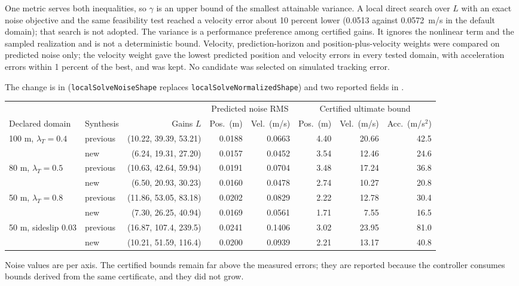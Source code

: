 \documentclass[11pt]{article}
\begin{document}
One metric serves both inequalities, so $\gamma$ is an upper bound of the
smallest attainable variance. A local direct search over $L$ with an exact
noise objective and the same feasibility test reached a velocity error about
10 percent lower (0.0513 against 0.0572~m/s in the default domain); that
search is not adopted. The variance is a performance preference among certified
gains. It ignores the nonlinear term and the sampled realization and is not a
deterministic bound. Velocity, prediction-horizon and position-plus-velocity
weights were compared on predicted noise only; the velocity weight gave the
lowest predicted position and velocity errors in every tested domain, with
acceleration errors within 1 percent of the best, and was kept. No candidate
was selected on simulated tracking error.

The change is in 
(\texttt{localSolveNoiseShape} replaces \texttt{localSolveNormalizedShape})
and two reported fields in .

\begin{center}\footnotesize\setlength{\tabcolsep}{4pt}
\begin{tabular}{@{}llrrrrrr@{}}
\toprule
&&&\multicolumn{2}{c}{Predicted noise RMS}&\multicolumn{3}{c}{Certified ultimate bound}\\
Declared domain&Synthesis&Gains $L$&Pos.\ (m)&Vel.\ (m/s)&Pos.\ (m)&Vel.\ (m/s)&Acc.\ (m/s$^2$)\\
\midrule
100 m, $\lambda_T=0.4$&previous&(10.22, 39.39, 53.21)&0.0188&0.0663&4.40&20.66&42.5\\
&new&(6.24, 19.31, 27.20)&0.0157&0.0452&3.54&12.46&24.6\\
80 m, $\lambda_T=0.5$&previous&(10.63, 42.64, 59.94)&0.0191&0.0704&3.48&17.24&36.8\\
&new&(6.50, 20.93, 30.23)&0.0160&0.0478&2.74&10.27&20.8\\
50 m, $\lambda_T=0.8$&previous&(11.86, 53.05, 83.18)&0.0202&0.0829&2.22&12.78&30.4\\
&new&(7.30, 26.25, 40.94)&0.0169&0.0561&1.71&7.55&16.5\\
50 m, sideslip 0.03&previous&(16.87, 107.4, 239.5)&0.0241&0.1406&3.02&23.95&81.0\\
&new&(10.21, 51.59, 116.4)&0.0200&0.0939&2.21&13.17&40.8\\
\bottomrule
\end{tabular}\end{center}
Noise values are per axis. The certified bounds remain far above the measured
errors; they are reported because the controller consumes bounds derived from
the same certificate, and they did not grow.
\end{document}
